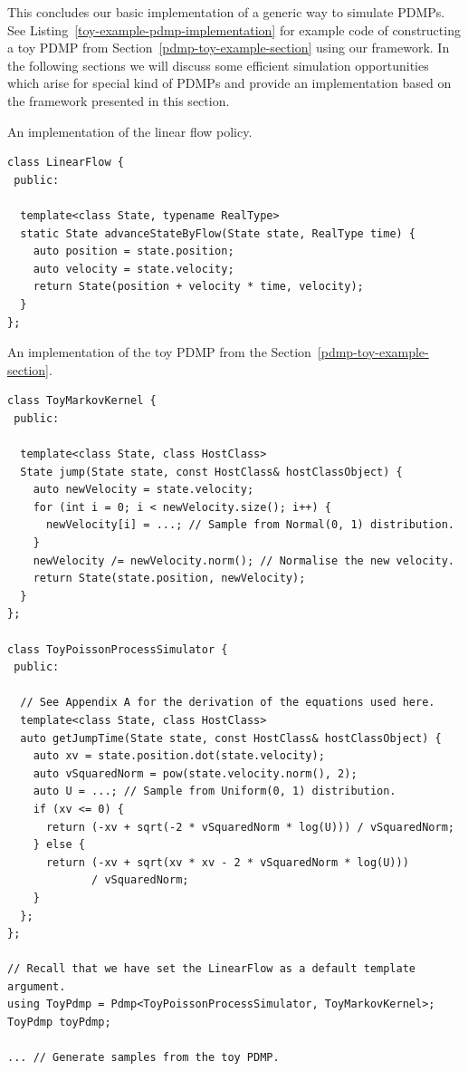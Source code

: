 \documentclass[report.tex]{subfiles}
\begin{document}
This concludes our basic implementation of a generic way to simulate PDMPs.
See Listing~\ref{toy-example-pdmp-implementation} for example code of constructing
a toy PDMP from Section~\ref{pdmp-toy-example-section} using our framework.
In the following sections we will discuss some efficient simulation opportunities
which arise for special kind of PDMPs and provide an implementation based on the
framework presented in this section.

\begin{lstfloat}
\caption{An implementation of the linear flow policy.}
\label{linear-flow-implementation}
\begin{lstlisting}
class LinearFlow {
 public:

  template<class State, typename RealType>
  static State advanceStateByFlow(State state, RealType time) {
    auto position = state.position;
    auto velocity = state.velocity;
    return State(position + velocity * time, velocity);
  }
};
\end{lstlisting}
\end{lstfloat}

\begin{lstfloat}
\caption{An implementation of the toy PDMP from the Section~\ref{pdmp-toy-example-section}.}
\label{toy-example-pdmp-implementation}
\begin{lstlisting}
class ToyMarkovKernel {
 public:

  template<class State, class HostClass>
  State jump(State state, const HostClass& hostClassObject) {
    auto newVelocity = state.velocity;
    for (int i = 0; i < newVelocity.size(); i++) {
      newVelocity[i] = ...; // Sample from Normal(0, 1) distribution.
    }
    newVelocity /= newVelocity.norm(); // Normalise the new velocity.
    return State(state.position, newVelocity);
  }
};

class ToyPoissonProcessSimulator {
 public:

  // See Appendix A for the derivation of the equations used here.
  template<class State, class HostClass>
  auto getJumpTime(State state, const HostClass& hostClassObject) {
    auto xv = state.position.dot(state.velocity);
    auto vSquaredNorm = pow(state.velocity.norm(), 2);
    auto U = ...; // Sample from Uniform(0, 1) distribution.
    if (xv <= 0) {
      return (-xv + sqrt(-2 * vSquaredNorm * log(U))) / vSquaredNorm;
    } else {
      return (-xv + sqrt(xv * xv - 2 * vSquaredNorm * log(U)))
             / vSquaredNorm;
    }
  };
};

// Recall that we have set the LinearFlow as a default template argument.
using ToyPdmp = Pdmp<ToyPoissonProcessSimulator, ToyMarkovKernel>;
ToyPdmp toyPdmp;

... // Generate samples from the toy PDMP.
\end{lstlisting}
\end{lstfloat}
\end{document}
